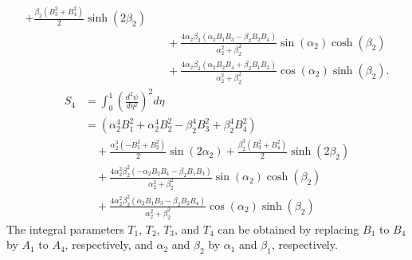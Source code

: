\documentclass[preprint,12pt]{elsarticle}
\begin{document}
\begin{appendices}
\begin{equation}
\begin{aligned}
		 + \frac{\beta_2 (B_3^2 + B_4^2)}{2} \sinh(2\beta_2) \\
		&\quad + \frac{4 \alpha_2 \beta_2 (\alpha_2 B_1 B_3 - \beta_2 B_2 B_4)}{\alpha_2^2 + \beta_2^2} \sin(\alpha_2) \cosh(\beta_2) \\
		&\quad + \frac{4 \alpha_2 \beta_2 (\alpha_2 B_2 B_4 + \beta_2 B_1 B_3)}{\alpha_2^2 + \beta_2^2} \cos(\alpha_2) \sinh(\beta_2).
	\end{aligned}
\end{equation}
%
\begin{equation}\label{eq:inte_dphi4}
	\begin{split}
		S_4 &= \int_{0}^{1} \left( \frac{d^2 \psi}{d \eta^2} \right)^2 d \eta \\
		&= \left( \alpha_2^4 B_1^2 + \alpha_2^4 B_2^2 - \beta_2^4 B_3^2 + \beta_2^4 B_4^2 \right) \\
		&\quad + \frac{\alpha_2^3 (-B_1^2 + B_2^2)}{2} \sin(2 \alpha_2)
		+ \frac{\beta_2^3 (B_3^2 + B_4^2)}{2} \sinh(2 \beta_2) \\
		&\quad + \frac{4 \alpha_2^2 \beta_2^2 (-\alpha_2 B_2 B_4 - \beta_2 B_1 B_3)}{\alpha_2^2 + \beta_2^2} \sin(\alpha_2) \cosh(\beta_2) \\
		&\quad + \frac{4 \alpha_2^2 \beta_2^2 (\alpha_2 B_1 B_3 - \beta_2 B_2 B_4)}{\alpha_2^2 + \beta_2^2} \cos(\alpha_2) \sinh(\beta_2)
	\end{split}
\end{equation}
%
The integral parameters \( T_1 \), \( T_2 \), \( T_3 \), and \( T_4 \) can be obtained by replacing \( B_1 \) to \( B_4 \) by \( A_1 \) to \( A_4 \), respectively, and \( \alpha_2 \) and \( \beta_2 \) by \( \alpha_1 \) and \( \beta_1 \), respectively.

\end{appendices}
\FloatBarrier


	
\end{document}
